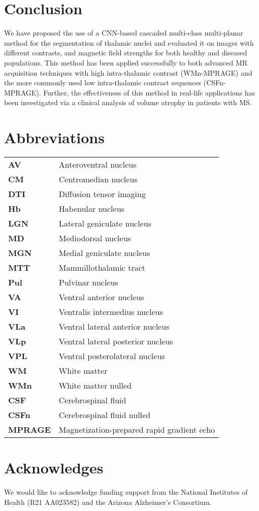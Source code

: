 \section{Conclusion}
We have proposed the use of a CNN-based cascaded multi-class multi-planar method for the segmentation of thalamic nuclei and evaluated it on images with different contrasts, and magnetic field strengths for both healthy and diseased populations. This method has been applied successfully to both advanced MR acquisition techniques with high intra-thalamic contrast (WMn-MPRAGE) and the more commonly used low intra-thalamic contrast sequences (CSFn-MPRAGE). Further, the effectiveness of this method in real-life applications has been investigated via a clinical analysis of volume atrophy in patients with MS\@.

\section{Abbreviations}

{\singlespacing%
\begin{tabular}{@{} >{\bfseries}l @{\hspace{1em}} l}
  AV & Anteroventral nucleus \\
  CM & Centromedian nucleus \\
  DTI & Diffusion tensor imaging \\
  Hb & Habenular nucleus \\
  LGN & Lateral geniculate nucleus \\
  MD & Mediodorsal nucleus \\
  MGN & Medial geniculate nucleus \\
  MTT & Mammillothalamic tract \\
  Pul & Pulvinar nucleus \\
  VA & Ventral anterior nucleus \\
  VI & Ventralis intermedius nucleus \\
  VLa & Ventral lateral anterior nucleus \\
  VLp & Ventral lateral posterior nucleus \\
  VPL & Ventral posterolateral nucleus \\
  WM & White matter \\
  WMn & White matter nulled \\
  CSF & Cerebrospinal fluid \\
  CSFn & Cerebrospinal fluid nulled \\
  MPRAGE & Magnetization-prepared rapid gradient echo \\
\end{tabular}
}

\section{Acknowledges}
We would like to acknowledge funding support from the National Institutes of Health (R21 AA023582) and the Arizona Alzheimer's Consortium.



